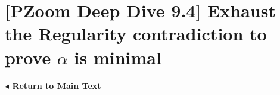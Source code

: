 \documentclass[11pt]{article}
\begin{document}
\pagestyle{empty} %

\section*{[PZoom Deep Dive 9.4] Exhaust the Regularity contradiction to prove $\alpha$ is minimal}

\vspace{0.8cm}
\noindent
\href{\pzbaseUrl/assets/pdfs/entry-0009/entry-0009-ordinals-part-i.pdf#body:entry-0009-4}{\textbf{\ensuremath{\blacktriangleleft} Return to Main Text}}
\end{document}
